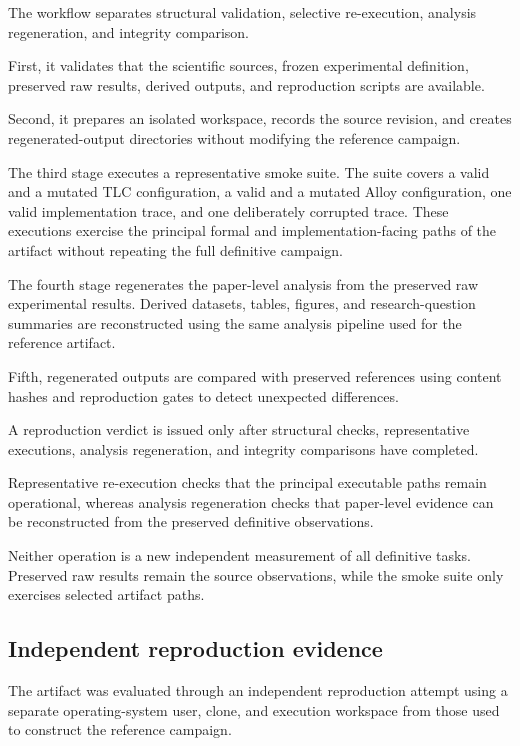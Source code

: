 The workflow separates structural validation, selective re-execution,
analysis regeneration, and integrity comparison.

First, it validates that the scientific sources, frozen experimental
definition, preserved raw results, derived outputs, and reproduction scripts
are available.

Second, it prepares an isolated workspace, records the source revision, and
creates regenerated-output directories without modifying the reference
campaign.

The third stage executes a representative smoke suite. The suite covers
a valid and a mutated TLC configuration, a valid and a mutated Alloy
configuration, one valid implementation trace, and one deliberately
corrupted trace. These executions exercise the principal formal and
implementation-facing paths of the artifact without repeating the full
definitive campaign.

The fourth stage regenerates the paper-level analysis from the preserved
raw experimental results. Derived datasets, tables, figures, and
research-question summaries are reconstructed using the same analysis
pipeline used for the reference artifact.

Fifth, regenerated outputs are compared with preserved references using
content hashes and reproduction gates to detect unexpected differences.

A reproduction verdict is issued only after structural checks, representative
executions, analysis regeneration, and integrity comparisons have completed.

Representative re-execution checks that the principal executable paths remain
operational, whereas analysis regeneration checks that paper-level evidence
can be reconstructed from the preserved definitive observations.

Neither operation is a new independent measurement of all definitive tasks.
Preserved raw results remain the source observations, while the smoke suite
only exercises selected artifact paths.

\subsection{Independent reproduction evidence}
\label{subsec:independent-reproduction}

The artifact was evaluated through an independent reproduction attempt using
a separate operating-system user, clone, and execution workspace from those
used to construct the reference campaign.

